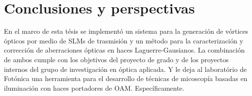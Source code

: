


\chapter{Conclusiones y perspectivas}
\label{cha:Conclusiones}



En el marco de esta tésis se implementó un sistema para la generación
de vórtices ópticos por medio de SLMs de trasmisión y un método para
la caracterización y corrección de aberraciones ópticas en haces Laguerre-Gausianos. 
La combinación de ambos cumple con los objetivos del proyecto de grado
y de los proyectos internos del grupo de investigación en óptica
aplicada. Y le deja al laboratório de Fotónica una herramienta para el
desarrollo de técnicas de micoscopía basadas en iluminación con haces
portadores de OAM. 
Específicamente. 

